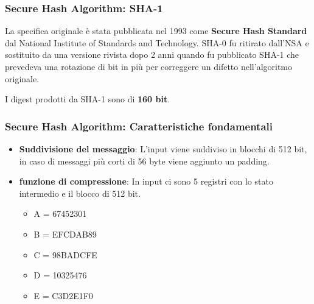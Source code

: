 \begin{frame}
	\frametitle{Secure Hash Algorithm: SHA-1}

	La specifica originale è stata pubblicata nel 1993 come \textbf{Secure Hash Standard} dal National Institute of Standards and Technology.
	SHA-0 fu ritirato dall'NSA e sostituito da una versione rivista dopo 2 anni quando fu pubblicato SHA-1 che prevedeva una rotazione di bit in più
	per correggere un difetto nell'algoritmo originale.

	\vspace{1cm}

	I digest prodotti da SHA-1 sono di \textbf{160 bit}.
\end{frame}

\begin{frame}
	\frametitle{Secure Hash Algorithm: Caratteristiche fondamentali}
	\begin{itemize}
		\item \textbf{Suddivisione del messaggio}: L'input viene suddiviso in blocchi di 512 bit, in caso di messaggi
		      più corti di 56 byte viene aggiunto un padding.
		\item \textbf{funzione di compressione}: In input ci sono 5 registri con lo stato intermedio e il blocco di 512 bit.
		      \begin{itemize}
			      \item A = 67452301
			      \item B = EFCDAB89
			      \item C = 98BADCFE
			      \item D = 10325476
			      \item E = C3D2E1F0
		      \end{itemize}
	\end{itemize}
\end{frame}


